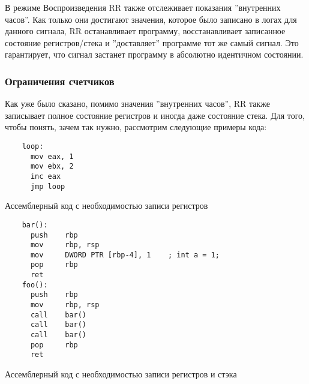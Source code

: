 В режиме Воспроизведения RR также отслеживает показания ''внутренних часов''.
Как только они достигают значения, которое было записано в логах для данного
сигнала, RR останавливает программу, восстанавливает записанное состояние
регистров/стека и ''доставляет'' программе тот же самый сигнал. Это гарантирует,
что сигнал застанет программу в абсолютно идентичном состоянии.

\subsubsection{Ограничения счетчиков}




Как уже было сказано, помимо значения ''внутренних часов'', RR также записывает
полное состояние регистров и иногда даже состояние стека. Для того, чтобы понять, зачем
так нужно, рассмотрим следующие примеры кода:

\begin{codelisting}[H]
  \begin{verbatim}
    loop:
      mov eax, 1
      mov ebx, 2
      inc eax
      jmp loop
  \end{verbatim}
  \caption{Ассемблерный код с необходимостью записи регистров}
  \label{lst:good-loop}
\end{codelisting}

\begin{codelisting}[H]
  \begin{verbatim}
    bar():
      push    rbp
      mov     rbp, rsp
      mov     DWORD PTR [rbp-4], 1    ; int a = 1;
      pop     rbp
      ret
    foo():
      push    rbp
      mov     rbp, rsp
      call    bar()
      call    bar()
      call    bar()
      pop     rbp
      ret
  \end{verbatim}
  \caption{Ассемблерный код с необходимостью записи регистров и стэка}
  \label{lst:multiple-calls}
\end{codelisting}

